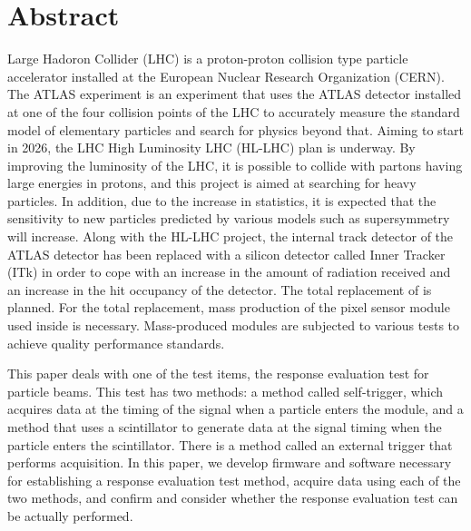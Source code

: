 \chapter*{Abstract}

Large Hadoron Collider (LHC) is a proton-proton collision type particle accelerator installed at the European Nuclear Research Organization (CERN). The ATLAS experiment is an experiment that uses the ATLAS detector installed at one of the four collision points of the LHC to accurately measure the standard model of elementary particles and search for physics beyond that. Aiming to start in 2026, the LHC High Luminosity LHC (HL-LHC) plan is underway. By improving the luminosity of the LHC, it is possible to collide with partons having large energies in protons, and this project is aimed at searching for heavy particles. In addition, due to the increase in statistics, it is expected that the sensitivity to new particles predicted by various models such as supersymmetry will increase. Along with the HL-LHC project, the internal track detector of the ATLAS detector has been replaced with a silicon detector called Inner Tracker (ITk) in order to cope with an increase in the amount of radiation received and an increase in the hit occupancy of the detector. The total replacement of is planned. For the total replacement, mass production of the pixel sensor module used inside is necessary. Mass-produced modules are subjected to various tests to achieve quality performance standards.\par
This paper deals with one of the test items, the response evaluation test for particle beams. This test has two methods: a method called self-trigger, which acquires data at the timing of the signal when a particle enters the module, and a method that uses a scintillator to generate data at the signal timing when the particle enters the scintillator. There is a method called an external trigger that performs acquisition. In this paper, we develop firmware and software necessary for establishing a response evaluation test method, acquire data using each of the two methods, and confirm and consider whether the response evaluation test can be actually performed. 
